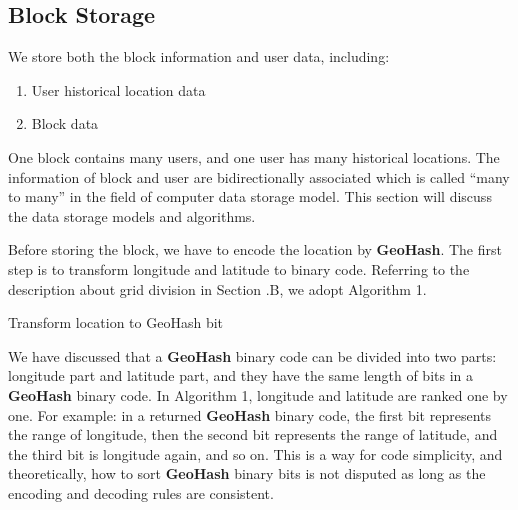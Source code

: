 \documentclass[conference]{IEEEtran}
\begin{document}
\subsection{Block Storage}
We store both the block information and user data, including:
\begin{enumerate}
    \item User historical location data
    \item Block data
\end{enumerate}

One block contains many users, and one user has many historical locations.
The information of block and user are bidirectionally associated which is called “many to many” in the field of computer data storage model.
This section will discuss the data storage models and algorithms.

Before storing the block, we have to encode the location by \textbf{GeoHash}.
The first step is to transform longitude and latitude to binary code.
Referring to the description about grid division in Section \uppercase\expandafter{}.B, we adopt Algorithm 1.

\begin{algorithm}[h]
    \caption{Transform location to GeoHash bit}
    \begin{algorithmic}[1]
        \Else
        \EndIf
        \Else
        \EndIf
        \EndWhile
        \EndFunction
    \end{algorithmic}
\end{algorithm}

We have discussed that a \textbf{GeoHash} binary code can be divided into two parts: longitude part and latitude part, and they have the same length of bits in a \textbf{GeoHash} binary code.
In Algorithm 1, longitude and latitude are ranked one by one.
For example: in a returned \textbf{GeoHash} binary code, the first bit represents the range of longitude, then the second bit represents the range of latitude, and the third bit is longitude again, and so on.
This is a way for code simplicity, and theoretically, how to sort \textbf{GeoHash} binary bits is not disputed as long as the encoding and decoding rules are consistent.
\end{document}

